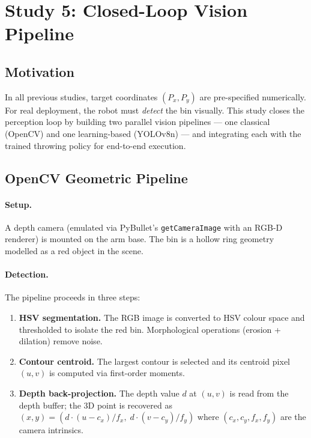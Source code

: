 \section{Study 5: Closed-Loop Vision Pipeline}
\label{sec:study5}

\subsection{Motivation}
\label{sec:study5:motivation}

In all previous studies, target coordinates $(P_x, P_y)$ are pre-specified numerically.
For real deployment, the robot must \emph{detect} the bin visually.
This study closes the perception loop by building two parallel vision pipelines ---
one classical (OpenCV) and one learning-based (YOLOv8n) --- and integrating each
with the trained throwing policy for end-to-end execution.

\subsection{OpenCV Geometric Pipeline}
\label{sec:study5:opencv}

\paragraph{Setup.}
A depth camera (emulated via PyBullet's \texttt{getCameraImage} with an RGB-D renderer)
is mounted on the arm base.
The bin is a hollow ring geometry modelled as a red object in the scene.

\paragraph{Detection.}
The pipeline proceeds in three steps:
\begin{enumerate}
  \item \textbf{HSV segmentation.} The RGB image is converted to HSV colour space and
        thresholded to isolate the red bin.
        Morphological operations (erosion + dilation) remove noise.
  \item \textbf{Contour centroid.} The largest contour is selected and its centroid
        pixel $(u, v)$ is computed via first-order moments.
  \item \textbf{Depth back-projection.} The depth value $d$ at $(u, v)$ is read from
        the depth buffer; the 3D point is recovered as
        $(x, y) = (d \cdot (u - c_x) / f_x,\; d \cdot (v - c_y) / f_y)$
        where $(c_x, c_y, f_x, f_y)$ are the camera intrinsics.
\end{enumerate}

